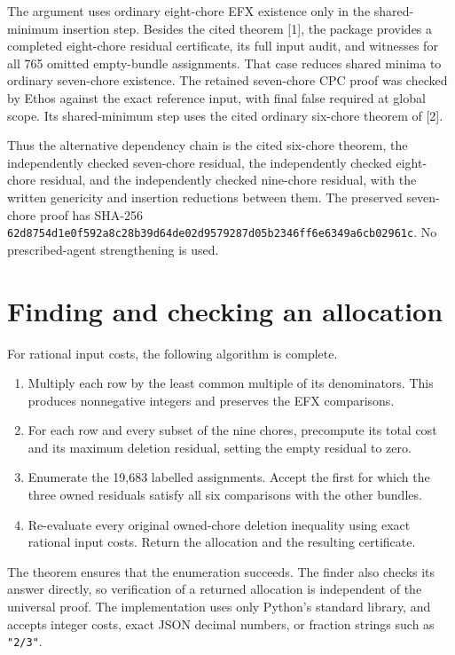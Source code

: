 \documentclass[
  11pt,
]{article}
\providecommand{\tightlist}{%
  \setlength{\itemsep}{0pt}\setlength{\parskip}{0pt}}
\begin{document}
The argument uses ordinary eight-chore EFX existence only in the
shared-minimum insertion step. Besides the cited theorem {[}1{]}, the
package provides a completed eight-chore residual certificate, its full
input audit, and witnesses for all 765 omitted empty-bundle assignments.
That case reduces shared minima to ordinary seven-chore existence. The
retained seven-chore CPC proof was checked by Ethos against the exact
reference input, with final false required at global scope. Its
shared-minimum step uses the cited ordinary six-chore theorem of
{[}2{]}.

Thus the alternative dependency chain is the cited six-chore theorem,
the independently checked seven-chore residual, the independently
checked eight-chore residual, and the independently checked nine-chore
residual, with the written genericity and insertion reductions between
them. The preserved seven-chore proof has SHA-256
\texttt{62d8754d1e0f592a8c28b39d64de02d9579287d05b2346ff6e6349a6cb02961c}.
No prescribed-agent strengthening is used.

\section{Finding and checking an
allocation}\label{finding-and-checking-an-allocation}

For rational input costs, the following algorithm is complete.

\begin{enumerate}
\def\labelenumi{\arabic{enumi}.}
\tightlist
\item
  Multiply each row by the least common multiple of its denominators.
  This produces nonnegative integers and preserves the EFX comparisons.
\item
  For each row and every subset of the nine chores, precompute its total
  cost and its maximum deletion residual, setting the empty residual to
  zero.
\item
  Enumerate the 19,683 labelled assignments. Accept the first for which
  the three owned residuals satisfy all six comparisons with the other
  bundles.
\item
  Re-evaluate every original owned-chore deletion inequality using exact
  rational input costs. Return the allocation and the resulting
  certificate.
\end{enumerate}

The theorem ensures that the enumeration succeeds. The finder also
checks its answer directly, so verification of a returned allocation is
independent of the universal proof. The implementation uses only
Python's standard library, and accepts integer costs, exact JSON decimal
numbers, or fraction strings such as \texttt{"2/3"}.
\end{document}
